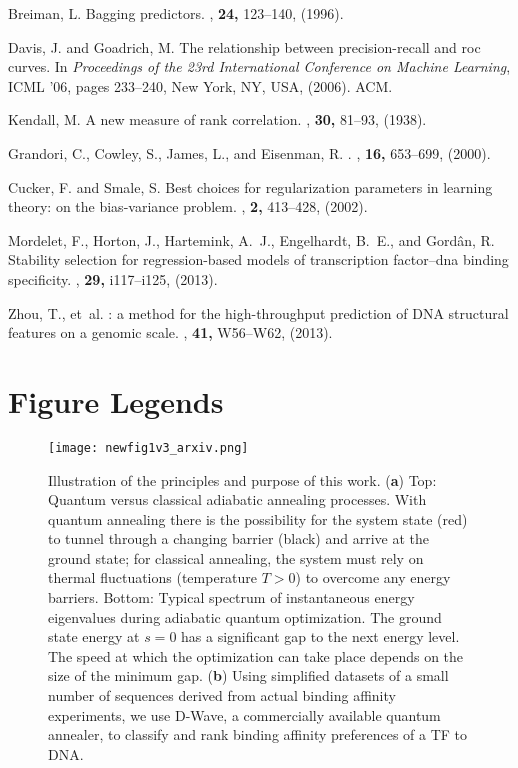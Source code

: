\documentclass[aps,pra,groupedaddress,nofootinbib,notitlepage,showpacs,floatfix,superscriptaddress]{revtex4-1}
\begin{document}
\begin{thebibliography}{10}
Breiman, L.
\newblock Bagging predictors.
, {\bf 24,} 123--140, (1996).

Davis, J. and Goadrich, M.
\newblock The relationship between precision-recall and roc curves.
\newblock In {\em Proceedings of the 23rd International Conference on Machine
  Learning}, ICML '06, pages 233--240, New York, NY, USA, (2006). ACM.

Kendall, M.
\newblock A new measure of rank correlation.
, {\bf 30,} 81--93, (1938).

Grandori, C., Cowley, S., James, L., and Eisenman, R.
.
, {\bf {16},}
  {653--699}, ({2000}).

Cucker, F. and Smale, S.
\newblock Best choices for regularization parameters in learning theory: on the
  bias-variance problem.
, {\bf 2,} 413--428,
  (2002).

Mordelet, F., Horton, J., Hartemink, A.~J., Engelhardt, B.~E., and Gord{\^a}n,
  R.
\newblock Stability selection for regression-based models of transcription
  factor--dna binding specificity.
, {\bf 29,} i117--i125, (2013).

Zhou, T., et~al.
: a method for the high-throughput prediction of {DNA}
  structural features on a genomic scale.
, {\bf 41,} W56--W62, (2013).

\end{thebibliography}
\clearpage 

\section*{Figure Legends}
\begin{figure}[htp]
 \texttt{[image: newfig1v3\_arxiv.png]}
\caption{Illustration of the principles and purpose of this work. (\textbf{a}) Top: Quantum versus classical adiabatic annealing processes. With quantum annealing there is the possibility for the system state (red) to tunnel through a changing barrier (black) and arrive at the ground state; for classical annealing, the system must rely on thermal fluctuations (temperature $T>0$) to overcome any energy barriers. Bottom: Typical spectrum of instantaneous energy eigenvalues during adiabatic quantum optimization. The ground state energy at $s=0$ has a significant gap to the next energy level. The speed at which the optimization can take place depends on the size of the minimum gap. (\textbf{b}) Using simplified datasets of a small number of sequences derived from actual binding affinity experiments, we use D-Wave, a commercially available quantum annealer, to classify and rank binding affinity preferences of a TF to DNA.}\label{fig:introfig}
\end{figure}
\end{document}
